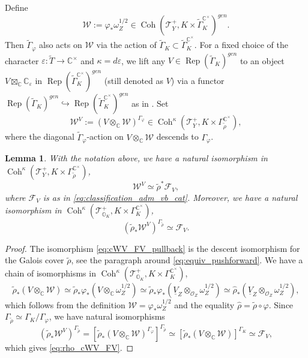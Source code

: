 \documentclass[11pt, a4paper]{amsart}
\newcommand{\C}{\mathbb{C}}
\newcommand{\orb}{\mathbb{O}}
\newcommand{\orbk}{\orb_{K}}
\newcommand{\cF}{\mathcal{F}}
\newcommand{\cW}{\mathcal{W}}
\newcommand{\cWV}{\cW^{\scriptscriptstyle V}}
\newcommand{\tGamma}{\widetilde{\Gamma}}
\DeclareMathOperator{\Rep}{Rep}
\DeclareMathOperator{\Coh}{Coh}
\newcommand{\smallhalf}{{\scriptscriptstyle 1/2}}
\newcommand{\TT}{\mathscr{T}}
\newcommand{\cm}{\C^\times}
\newcommand{\OO}{\mathcal{O}}
\newtheorem{Lem}[Thm]{Lemma}
\theoremstyle{definition}
\numberwithin{equation}{section}
\begin{document}
Define
\begin{equation} \label{eq:cW_Y}
	\cW := \varphi_* \omega_Z^{\smallhalf} \in \Coh(\TT^+_Y, K \times \tGamma_K^{\cm})^{gen}.
\end{equation}
Then $\tGamma_\varphi$ also acts on $\cW$ via the action of $\tGamma_K \subset \tGamma_K^{\cm}$. 
For a fixed choice of the character $\varepsilon: \widetilde{T} \to \cm$ and $\kappa = d\varepsilon$, we lift any $V \in \Rep(\tGamma_K)^{gen}$ to an object $V \boxtimes_\C \C_\varepsilon$ in $\Rep(\tGamma_K^{\cm})^{gen}$ (still denoted as $V$) via a functor $\Rep(\tGamma_K)^{gen} \hookrightarrow \Rep(\tGamma_K^{\cm})^{gen}$ as in .
Set
\begin{equation} \label{eq:cWV_Y}
	\cWV := (V \otimes_\C \cW)^{\Gamma_\varphi} \in \Coh^\kappa(\TT^+_Y, K \times \Gamma_{\tilde{\rho}}^{\cm}),
\end{equation}
where the diagonal $\tGamma_\varphi$-action on $V \otimes_\C \cW$ descends to $\Gamma_\varphi$.

\begin{Lem} \label{lem:galois_pullback_adm_vb}
	With the notation above, we have a natural isomorphism in $\Coh^\kappa(\TT^+_Y, K \times \Gamma_{\tilde{\rho}}^{\cm})$,
\begin{equation} \label{eq:cWV_FV_pullback}
	\cWV \simeq \tilde{\rho}^* \cF_V,
\end{equation}
where $\cF_V$ is as in \eqref{eq:classification_adm_vb_cat}. Moreover, we have a natural isomorphism in $\Coh^\kappa(\TT^+_{\orbk}, K \times \Gamma_K^{\cm})$,
\begin{equation} \label{eq:rho_cWV_FV}
	(\tilde{\rho}_* \cWV)^{\Gamma_{\tilde{\rho}}} \simeq \cF_V.
\end{equation}
\end{Lem}

\begin{proof}
	The isomorphism \eqref{eq:cWV_FV_pullback} is the descent isomorphism for the Galois cover $\tilde{\rho}$, see the paragraph around \eqref{eq:equiv_pushforward}. We have a chain of isomorphisms in $\Coh^\kappa(\TT^+_{\orbk}, K \times \Gamma_K^{\cm})$,
	\begin{equation} \label{eq:rho_cWV}
		\tilde{\rho}_* (V \otimes_\C \cW) \simeq \tilde{\rho}_* \varphi_* (V \otimes_{\C} \omega_Z^{\smallhalf}) \simeq \tilde{\rho}_* \varphi_* (\underline{V}_Z \otimes_{\OO_Z} \omega_Z^{\smallhalf}) \simeq \hat{\rho}_* (\underline{V}_Z \otimes_{\OO_Z} \omega_Z^{\smallhalf}),
	\end{equation}
	which follows from the definition $\cW=\varphi_*\omega_Z^{\smallhalf}$ and the equality $\hat{\rho}=\tilde{\rho}\circ\varphi$. Since $\Gamma_{\tilde{\rho}} \simeq \Gamma_K/\Gamma_\varphi$, we have natural isomorphisms
	\[ 
		(\tilde{\rho}_* \cWV)^{\Gamma_{\tilde{\rho}}} = \left[\tilde{\rho}_* (V \otimes_\C \cW)^{\Gamma_\varphi}\right]^{\Gamma_{\tilde{\rho}}} \simeq \left[ \tilde{\rho}_* (V \otimes_\C \cW) \right]^{\Gamma_K} \simeq \cF_V,
	\]
	which gives \eqref{eq:rho_cWV_FV}.
\end{proof}
\end{document}
